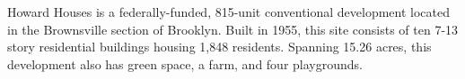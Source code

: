  

Howard Houses is a federally-funded, 815-unit conventional development located in the Brownsville section of Brooklyn. Built in 1955, this site consists of ten 7-13 story residential buildings housing 1,848 residents. Spanning 15.26 acres, this development also has green space, a farm, and four playgrounds. 